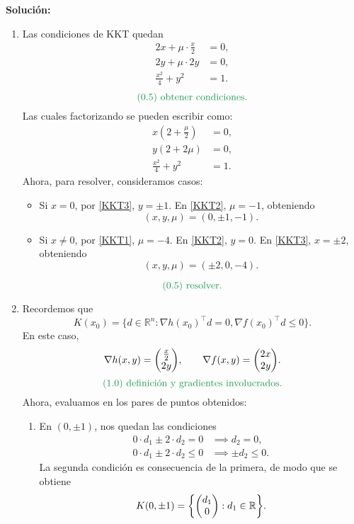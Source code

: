 \documentclass{article}
\begin{document}
\begin{enumerate}
		\textbf{Solución:} 
		\begin{enumerate}
			\item Las condiciones de KKT quedan
		\begin{align*}
			2x + \mu \cdot \frac{x}{2} &= 0, \\
			2y + \mu \cdot 2y &= 0, \\
			\frac{x^2}{4} + y^2 &= 1.
		\end{align*}
		\[
			\text{\textcolor{ForestGreen}{(0.5) obtener condiciones.}}
		\]
		Las cuales factorizando se pueden escribir como:
		\begin{align}
			x \left(2 + \frac{\mu}{2}\right) &= 0, \label{KKT1} \\
			y (2 + 2 \mu) &= 0, \label{KKT2} \\
			\frac{x^2}{4} + y^2 &= 1. \label{KKT3}
		\end{align}
		Ahora, para resolver, consideramos casos:
		\begin{itemize}
			\item Si \(x = 0\), por \eqref{KKT3}, \(y = \pm 1\). En \eqref{KKT2}, \(\mu = -1\), obteniendo
				\[
					(x, y, \mu) = (0, \pm 1, -1).
				\]
			\item Si \(x \neq 0\), por \eqref{KKT1}, \(\mu = -4\). En \eqref{KKT2}, \(y = 0\). En \eqref{KKT3}, \(x = \pm 2\), obteniendo
				\[
					(x, y, \mu) = (\pm 2, 0, -4).
				\]
		\end{itemize}
		\[
			\text{\textcolor{ForestGreen}{(0.5) resolver.}}
		\]
	\item Recordemos que
		\[
			K(x_0) = \{ d \in \mathbb{R}^n : \nabla h(x_0)^\top d = 0, \nabla f(x_0)^\top d \leq 0\}.
		\]
		En este caso,
		\[
			\nabla h(x, y) = \mqty(\frac{x}{2} \\ 2y), \qquad \nabla f(x, y) = \mqty(2x \\ 2y).
		\]
		\[
			\text{\textcolor{ForestGreen}{(1.0) definición y gradientes involucrados.}}
		\]
		Ahora, evaluamos en los pares de puntos obtenidos:
		\begin{enumerate}
			\item En \((0, \pm 1)\), nos quedan las condiciones
				\begin{align*}
					0 \cdot d_1 \pm 2 \cdot d_2 = 0 &\implies d_2 = 0, \\
					0 \cdot d_1 \pm 2 \cdot d_2 \leq 0 & \implies \pm d_2 \leq 0.
				\end{align*}
				La segunda condición es consecuencia de la primera, de modo que se obtiene
				\[
					K(0, \pm 1) = \qty{\mqty(d_1 \\ 0) : d_1 \in \mathbb{R}}.
\]
\end{enumerate}
\end{enumerate}
\end{enumerate}
\end{document}
